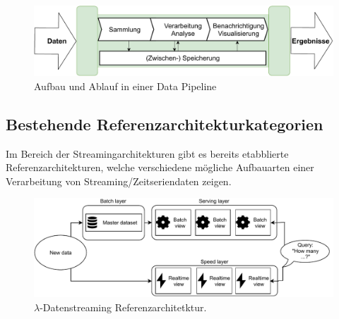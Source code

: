\begin{figure}[H]
\centering
\includegraphics[width=\textwidth]{graphics/DataPipeline.pdf}
\caption{Aufbau und Ablauf in einer Data Pipeline}
\label{abb:DataPipeline}
\end{figure}


\subsection{Bestehende Referenzarchitekturkategorien}
Im Bereich der Streamingarchitekturen gibt es bereits etabblierte Referenzarchitekturen, welche verschiedene mögliche Aufbauarten einer Verarbeitung von Streaming/Zeitseriendaten zeigen.

\begin{figure}[H]
\centering
\includegraphics[width=\textwidth]{graphics/Lambda-Reference-Architecture.pdf}
\caption[$\lambda$-Datenstreaming Referenzarchitetktur]{$\lambda$-Datenstreaming Referenzarchitetktur.\footnotemark}
\label{abb:LambdaStreaming}
\end{figure}

